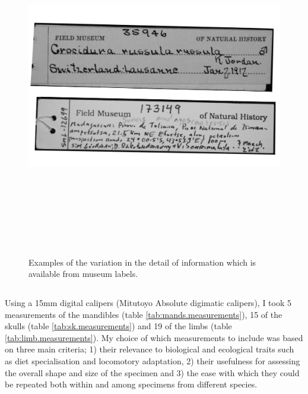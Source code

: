 \begin{figure}[h] 
  \centering
  \includegraphics[width = 15cm, height = 15cm, keepaspectratio=true]{Methods/figures/labels.png}
    \caption[Examples of museum labels]
    {Examples of the variation in the detail of information which is available from museum labels.}
  \label{fig:museum.labels}
\end{figure}
  
\subsection{} 
\label{sect:measurements} %

	Using a 15mm digital calipers (Mitutoyo Absolute digimatic calipers), I took 5 measurements of the mandibles (table \ref{tab:mands.measurements}), 15 of the skulls (table \ref{tab:sk.measurements}) and 19 of the limbs (table \ref{tab:limb.measurements}). My choice of which measurements to include was based on three main criteria; 1) their relevance to biological and ecological traits such as diet specialisation and locomotory adaptation, 2) their usefulness for assessing the overall shape and size of the specimen and 3) the ease with which they could be repeated both within and among specimens from different species. 

